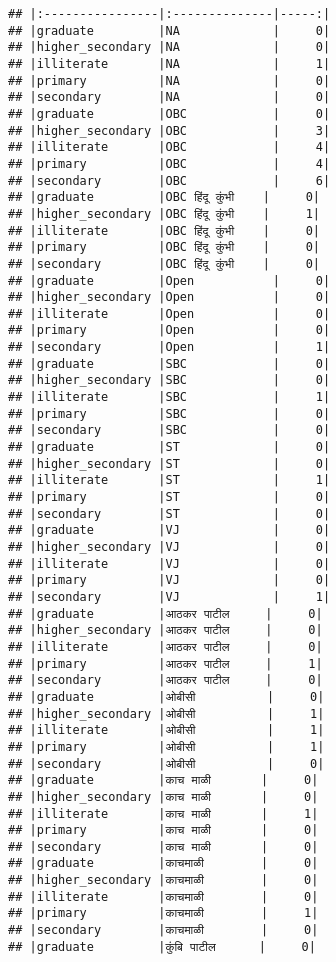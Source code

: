 \documentclass[
]{article}
\begin{document}
\begin{verbatim}
## |:----------------|:--------------|-----:|
## |graduate         |NA             |     0|
## |higher_secondary |NA             |     0|
## |illiterate       |NA             |     1|
## |primary          |NA             |     0|
## |secondary        |NA             |     0|
## |graduate         |OBC            |     0|
## |higher_secondary |OBC            |     3|
## |illiterate       |OBC            |     4|
## |primary          |OBC            |     4|
## |secondary        |OBC            |     6|
## |graduate         |OBC हिंदू कुंभी    |     0|
## |higher_secondary |OBC हिंदू कुंभी    |     1|
## |illiterate       |OBC हिंदू कुंभी    |     0|
## |primary          |OBC हिंदू कुंभी    |     0|
## |secondary        |OBC हिंदू कुंभी    |     0|
## |graduate         |Open           |     0|
## |higher_secondary |Open           |     0|
## |illiterate       |Open           |     0|
## |primary          |Open           |     0|
## |secondary        |Open           |     1|
## |graduate         |SBC            |     0|
## |higher_secondary |SBC            |     0|
## |illiterate       |SBC            |     1|
## |primary          |SBC            |     0|
## |secondary        |SBC            |     0|
## |graduate         |ST             |     0|
## |higher_secondary |ST             |     0|
## |illiterate       |ST             |     1|
## |primary          |ST             |     0|
## |secondary        |ST             |     0|
## |graduate         |VJ             |     0|
## |higher_secondary |VJ             |     0|
## |illiterate       |VJ             |     0|
## |primary          |VJ             |     0|
## |secondary        |VJ             |     1|
## |graduate         |आठकर पाटील     |     0|
## |higher_secondary |आठकर पाटील     |     0|
## |illiterate       |आठकर पाटील     |     0|
## |primary          |आठकर पाटील     |     1|
## |secondary        |आठकर पाटील     |     0|
## |graduate         |ओबीसी          |     0|
## |higher_secondary |ओबीसी          |     1|
## |illiterate       |ओबीसी          |     1|
## |primary          |ओबीसी          |     1|
## |secondary        |ओबीसी          |     0|
## |graduate         |काच माळी       |     0|
## |higher_secondary |काच माळी       |     0|
## |illiterate       |काच माळी       |     1|
## |primary          |काच माळी       |     0|
## |secondary        |काच माळी       |     0|
## |graduate         |काचमाळी        |     0|
## |higher_secondary |काचमाळी        |     0|
## |illiterate       |काचमाळी        |     0|
## |primary          |काचमाळी        |     1|
## |secondary        |काचमाळी        |     0|
## |graduate         |कुंबि पाटील      |     0|

\end{verbatim}
\end{document}

